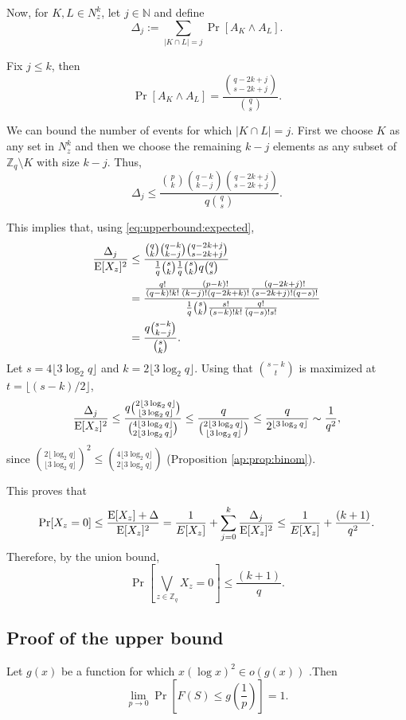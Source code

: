 Now, for $K, L \in N_z^k$, let $j \in \mathbb{N}$ and define
\[\Delta_j := \sum_{|K \cap L| = j} \Pr[A_K \land A_L].\]
\par Fix $j \leq k$, then 
\[\Pr[A_K \land A_L] = \frac{\binom{q - 2k + j}{s - 2k + j}}{\binom{q}{s}}.\]
\par
We can bound the number of events for which $|K \cap L| = j$. First we choose $K$ as any set in $N_z^k$ and then we choose the remaining $k- j$ elements as any subset of $\mathbb{Z}_q \setminus K$ with size $k - j$. Thus, 
\[\Delta_j \leq \frac{\binom{p}{k} \binom{q - k}{k - j}\binom{q - 2k + j}{s - 2k + j}}{q\binom{q}{s}}.\]
\par This implies that, using \ref{eq:upperbound:expected},
\begin{align*}
    \frac{\Delta_j}{\mathrm{E}[X_z]^2} &\leq \frac{\binom{q}{k} \binom{q - k}{k - j}\binom{q - 2k + j}{s - 2k + j}}{\frac{1}{q} \binom{s}{k}\frac{1}{q} \binom{s}{k}q\binom{q}{s}} \\
    &= \frac{\frac{q!}{(q - k)!k!}\frac{(p - k)!}{(k - j)!(q - 2k + k)!}\frac{(q - 2k + j)!}{(s - 2k + j)!(q - s)!}}{\frac{1}{q}\binom{s}{k}\frac{s!}{(s - k)!k!}\frac{q!}{(q - s)!s!}} \\
    &= \frac{q\binom{s - k}{k - j}}{\binom{s}{k}}.
\end{align*}
Let $s = 4\lfloor 3 \log_2 q \rfloor$ and $k = 2\lfloor 3 \log_2 q \rfloor$. Using that $\binom{s - k}{t}$ is maximized at $t = \lfloor (s - k) / 2\rfloor$,
\begin{align*}
\frac{\Delta_j}{\mathrm{E}[X_z]^2} \leq \frac{q \binom{2\lfloor 3 \log_2 q\rfloor}{\lfloor 3 \log_2 q \rfloor}}{\binom{4\lfloor 3\log_2 q \rfloor}{2\lfloor 3\log_2 q \rfloor}} \leq \frac{q}{\binom{2\lfloor 3 \log_2 q \rfloor }{ \lfloor 3 \log_2 q \rfloor}} \leq \frac{q}{2^{\lfloor 3 \log_2 q \rfloor}} \sim \frac{1}{q^2},
\end{align*}
since \(\binom{2\lfloor \log_2 q \rfloor}{\lfloor 3 \log_2 q \rfloor}^2 \leq \binom{4\lfloor 3 \log_2 q \rfloor }{2\lfloor 3 \log_2 q \rfloor}\) (Proposition \ref{ap:prop:binom}).   \par
This proves that
\[\mathrm{Pr}[X_z = 0] \leq \frac{\mathrm{E}[X_z] + \Delta}{\mathrm{E}[X_z]^2} = \frac{1}{E[X_z]} + \sum_{j = 0}^k \frac{\Delta_j}{\mathrm{E}[X_z]^2} \leq \frac{1}{E[X_z]} + \frac{(k + 1)}{q^2}.\]
Therefore, by the union bound,
\[\Pr\left[\bigvee_{z \in \mathbb{Z}_q} X_z = 0\right] \leq \frac{(k + 1)}{q}.\]

\subsection{Proof of the upper bound} 
\begin{lemma}\label{lem:upperbound}
    Let $g(x)$ be a function for which $x(\log x)^2 \in o(g(x))$ .Then
    \[\lim_{p \to 0}\Pr\left[F(S) \leq g\left(\frac{1}{p}\right)\right] = 1.\] 
\end{lemma}

